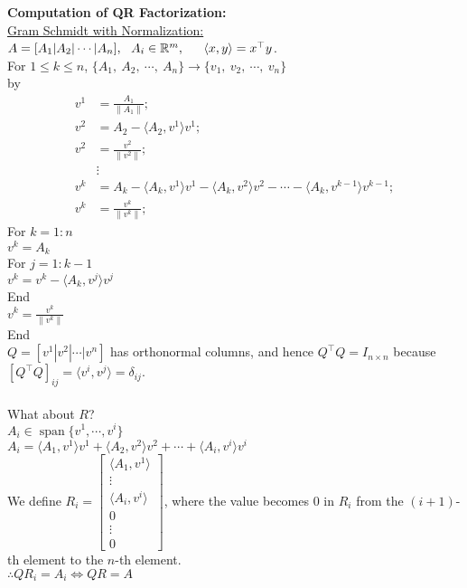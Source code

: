 \documentclass[letterpaper]{article}
\newcommand{\real}{\mathbb R}  %
\begin{document}
\textbf{Computation of QR Factorization:}\\
    \underline{Gram Schmidt with Normalization:}\\
        $A=[A_1|A_2|\dotsb |A_n],\ \ A_i\in\real^m,\ \hspace{1pc}\langle x,y\rangle=x^\top y$.\\
        For $1\leq k\leq n$, $\{A_1,\ A_2,\ \dotsb ,\ A_n\}\rightarrow \{v_1,\ v_2,\ \dotsb ,\ v_n\}$\\
        by
        \begin{align*}
            v^1 &=\frac{A_1}{\|A_1\|};\\
            v^2 &=A_2-\langle A_2,v^1\rangle v^1;\\
            v^2 &=\frac{v^2}{\|v^2\|};\\
            &\vdots\\
            v^k &=A_k-\langle A_k,v^1\rangle v^1-\langle A_k,v^2\rangle v^2-\dotsb -\langle A_k,v^{k-1}\rangle v^{k-1};\\
            v^k &=\frac{v^k}{\|v^k\|};
        \end{align*}
        For $k=1:n$\\
        \indent\hspace{4ex}$v^k=A_k$\\
        \indent\hspace{4ex}For $j=1:k-1$\\
        \indent\hspace{8ex}$v^k=v^k-\langle A_k,v^j\rangle v^j$\\
        \indent\hspace{4ex}End\\
        \indent\hspace{4ex}$v^k =\frac{v^k}{\|v^k\|}$\\
        End\\
        $Q=[v^1|v^2|\dotsb |v^n]$ has orthonormal columns, and hence $Q^\top Q=I_{n\times n}$ because $[Q^\top Q]_{ij}=\langle v^i, v^j\rangle=\delta_{ij}$.\\
\\
    What about $R$?\\
    $A_i\in\operatorname{span}\{v^1,\dotsb,v^i\}$\\
    $A_i=\langle A_1,v^1\rangle v^1+\langle A_2,v^2\rangle v^2+\dotsb+\langle A_i,v^i\rangle v^i$\\
    We define $R_i=\begin{bmatrix}
        \langle A_1,v^1\rangle\\
        \vdots\\
        \langle A_i,v^i\rangle\\
        0\\
        \vdots\\
        0
    \end{bmatrix}$, where the value becomes 0 in $R_i$ from the $(i+1)$-th element to the $n$-th element.\\
    $\therefore QR_i=A_i\Leftrightarrow QR=A$\\
\end{document}
